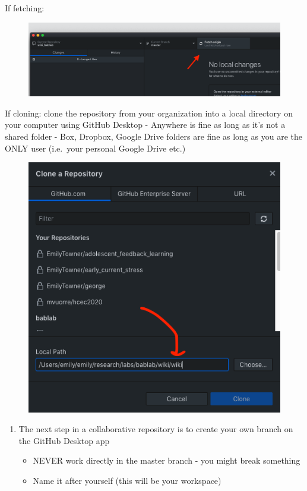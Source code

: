 \documentclass[]{book}
\providecommand{\tightlist}{%
  \setlength{\itemsep}{0pt}\setlength{\parskip}{0pt}}
\begin{document}
If fetching:

\begin{figure}
\centering
\includegraphics{images/research_protocols/github/30.png}
\caption{}
\end{figure}

If cloning: clone the repository from your organization into a local directory on your computer using GitHub Desktop
- Anywhere is fine as long as it's not a shared folder
- Box, Dropbox, Google Drive folders are fine as long as you are the ONLY user (i.e.~your personal Google Drive etc.)

\begin{figure}
\centering
\includegraphics{images/research_protocols/github/22.png}
\caption{}
\end{figure}

\begin{enumerate}
\def\labelenumi{\arabic{enumi}.}
\setcounter{enumi}{1}
\tightlist
\item
  The next step in a collaborative repository is to create your own branch on the GitHub Desktop app

  \begin{itemize}
  \tightlist
  \item
    NEVER work directly in the master branch - you might break something
  \item
    Name it after yourself (this will be your workspace)
  \end{itemize}
\end{enumerate}
\end{document}
